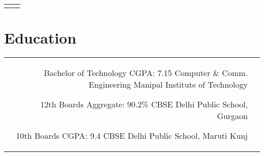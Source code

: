\documentclass[10pt]{article} %
\begin{document}
\begin{paracol}{2}
\begin{supertabular}{rl}





\end{supertabular}



\section{Education}





\begin{supertabular}{rl} %


	{Bachelor of Technology} %
	{CGPA: 7.15} %
	{Computer \& Comm. Engineering} %
	{Manipal Institute of Technology} %


	{12th Boards} %
	{Aggregate: 90.2\%} %
	{CBSE} %
	{Delhi Public School, Gurgaon} %


	{10th Boards} %
	{CGPA: 9.4} %
	{CBSE} %
	{Delhi Public School, Maruti Kunj} %


\end{supertabular}
\end{paracol}
\end{document}
